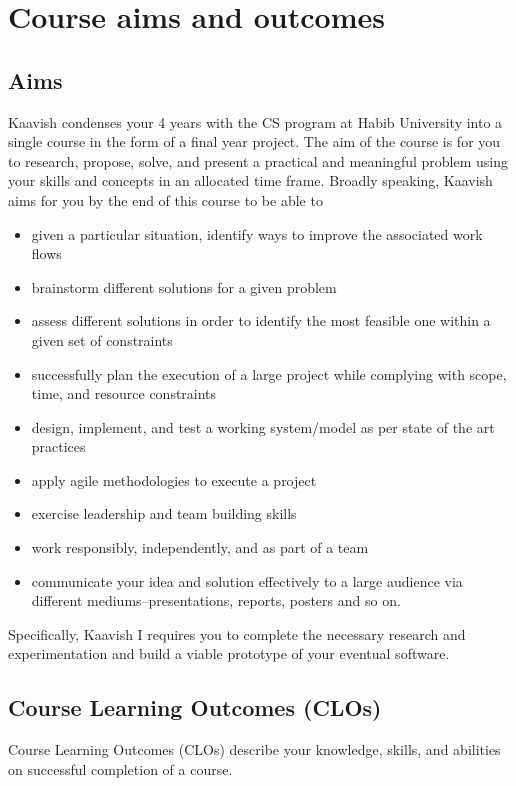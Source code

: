 \documentclass[a4paper]{article}
\newcommand{\new}[1]{{#1}}
\begin{document}
\section{Course aims and outcomes}
\subsection{Aims}
Kaavish condenses your 4 years with the CS program at Habib University into a single course in the form of a final year project. The aim of the course is for you to research, propose, solve, and present a practical and meaningful problem using your skills and concepts in an allocated time frame. Broadly speaking, Kaavish aims for you by the end of this course to be able to
\begin{itemize}
\item given a particular situation, identify ways to improve the associated work flows
\item brainstorm different solutions for a given problem
\item assess different solutions in order to identify the most feasible one within a given set of constraints
\item successfully plan the execution of a large project while complying with scope, time, and resource constraints
\item design, implement, and test a working system/model as per state of the art practices
\item apply agile methodologies to execute a project
\item exercise leadership and team building skills
\item work responsibly, independently, and as part of a team
\item communicate your idea and solution effectively to a large audience via different mediums--presentations, reports, posters and so on.
\end{itemize}

\new{Specifically, Kaavish I requires you to complete the necessary research and experimentation and build a viable prototype of your eventual software.}

\subsection{Course Learning Outcomes (CLOs)}

\new{Course Learning Outcomes (CLOs) describe your knowledge, skills, and abilities on successful completion of a course.}
\end{document}
